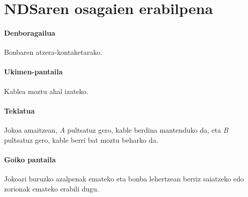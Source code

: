 \documentclass[dvipsnames]{../../../../AritzhClass}
\begin{document}
\pagebreak

\section{NDSaren osagaien erabilpena}

\paragraph{Denboragailua} Bonbaren atzera-kontaketarako.

\paragraph{Ukimen-pantaila} Kablea moztu ahal izateko.

\paragraph{Teklatua} Jokoa amaitzean, \textit{A} pultsatuz gero, kable berdina mantenduko da, eta \textit{B} pultsatuz gero, kable berri bat moztu beharko da.

\paragraph{Goiko pantaila} Jokoari buruzko azalpenak emateko eta bonba lehertzean berriz saiatzeko edo zorionak emateko erabili dugu.
\end{document}
